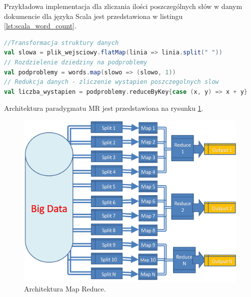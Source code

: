\newline Przykładowa implementacja dla zliczania ilości poszczególnych słów w danym dokumencie dla języka Scala jest przedstawiona w listingu \ref{lst:scala_word_count}.
\begin{lstlisting}[language=scala, caption={Przykład "Word Count"},captionpos=b, label={lst:scala_word_count}]
//Transformacja struktury danych
val slowa = plik_wejsciowy.flatMap(linia => linia.split(" "))
// Rozdzielenie dziedziny na podproblemy
val podproblemy = words.map(slowo => (slowo, 1))
// Redukcja danych - zliczenie wystapien poszczegolnych slow
val liczba_wystapien = podproblemy.reduceByKey{case (x, y) => x + y}
\end{lstlisting}
Architektura paradygmatu MR jest przedstawiona na rysunku \ref{fig:@=map_reduce_schema}. 
\begin{figure}
	\centering
	\includegraphics[scale=0.3]{map_reduce_flow.png}
	\caption{Architektura Map Reduce\cite{map_reduce_figure}.}
	\label{fig:@=map_reduce_schema}
\end{figure}
